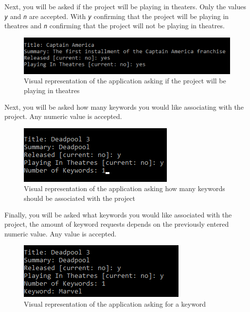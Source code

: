 \documentclass[
  english,
  a4paper,
,tablecaptionabove
]{scrartcl}
\begin{document}
Next, you will be asked if the project will be playing in theaters. Only
the values \emph{\texttt{y}} and \emph{\texttt{n}} are accepted. With
\emph{\texttt{y}} confirming that the project will be playing in
theatres and \emph{\texttt{n}} confirming that the project will not be
playing in theatres.

\begin{figure}
\centering
\includegraphics{images/user-guide/maintenance-mode/add-project-theatres.png}
\caption{Visual representation of the application asking if the project
will be playing in theatres}
\end{figure}

Next, you will be asked how many keywords you would like associating
with the project. Any numeric value is accepted.

\begin{figure}
\centering
\includegraphics{images/user-guide/maintenance-mode/add-project-keywords-amount.png}
\caption{Visual representation of the application asking how many
keywords should be associated with the project}
\end{figure}

Finally, you will be asked what keywords you would like associated with
the project, the amount of keyword requests depends on the previously
entered numeric value. Any value is accepted.

\begin{figure}
\centering
\includegraphics{images/user-guide/maintenance-mode/add-project-keywords.png}
\caption{Visual representation of the application asking for a keyword}
\end{figure}
\end{document}
